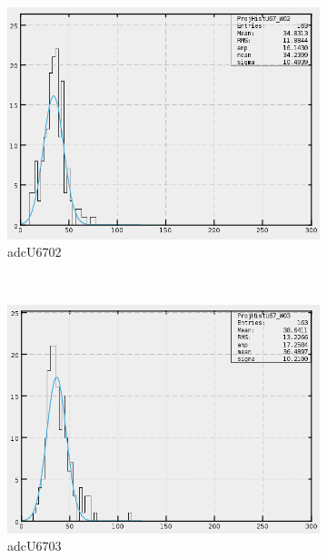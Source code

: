 \begin{figure}[h]
    \centering
    \begin{subfigure}[h]{0.3\textwidth}
        \centering
        \includegraphics[width=\textwidth, keepaspectratio = true]{adcU67_02}
        \caption{adcU6702}
        \label{fig:adcU67_02}
    \end{subfigure}
    ~
    \begin{subfigure}[h]{0.3\textwidth}
        \centering
        \includegraphics[width=\textwidth, keepaspectratio = true]{adcU67_03}
        \caption{adcU6703}
        \label{fig:adcU67_03}
    \end{subfigure}
    ~
    \begin{subfigure}[h]{0.3\textwidth}
        \centering

\end{subfigure}
\end{figure}

